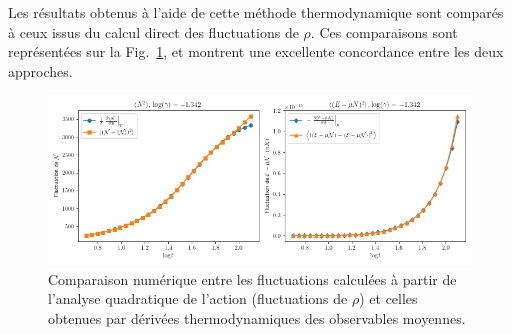 



Les résultats obtenus à l’aide de cette méthode thermodynamique sont comparés à ceux issus du calcul direct des fluctuations de \( \rho \). Ces comparaisons sont représentées sur la Fig.~\ref{fig.fluctu.A_com}, et montrent une excellente concordance entre les deux approches.

\begin{figure}[H]
	\centering 
	\includegraphics[width=1\textwidth]{Figures/fluctuations_plot_log_gamma=-1.342.png}	
	\caption{Comparaison numérique entre les fluctuations calculées à partir de l’analyse quadratique de l’action (fluctuations de \( \rho \)) et celles obtenues par dérivées thermodynamiques des observables moyennes.}
	\label{fig.fluctu.A_com}
\end{figure}

